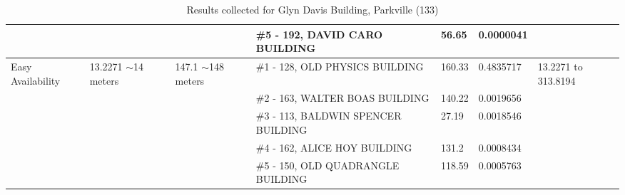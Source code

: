 \begin{table}[H]
{\begin{tabular}{|l|l|l|l|l|l|l|}
                   &                           &                                                 & \#5 - 192, DAVID CARO BUILDING                        & 56.65         & 0.0000041       &                           \\ \hline
Easy Availability  & 13.2271 $\sim$14 meters   & 147.1 $\sim$148  meters                         & \#1 - 128, OLD PHYSICS BUILDING                       & 160.33        & 0.4835717       & 13.2271 to 313.8194       \\ \hline
                   &                           &                                                 & \#2 - 163, WALTER BOAS BUILDING                       & 140.22        & 0.0019656       &                           \\ \hline
                   &                           &                                                 & \#3 - 113, BALDWIN SPENCER BUILDING                   & 27.19         & 0.0018546       &                           \\ \hline
                   &                           &                                                 & \#4 - 162, ALICE HOY BUILDING                         & 131.2         & 0.0008434       &                           \\ \hline
                   &                           &                                                 & \#5 - 150, OLD QUADRANGLE BUILDING                    & 118.59        & 0.0005763       &                           \\ \hline
\end{tabular}

}
\caption{Results collected for Glyn Davis Building, Parkville (133)}
\label{appendix:glyn}
\end{table}


